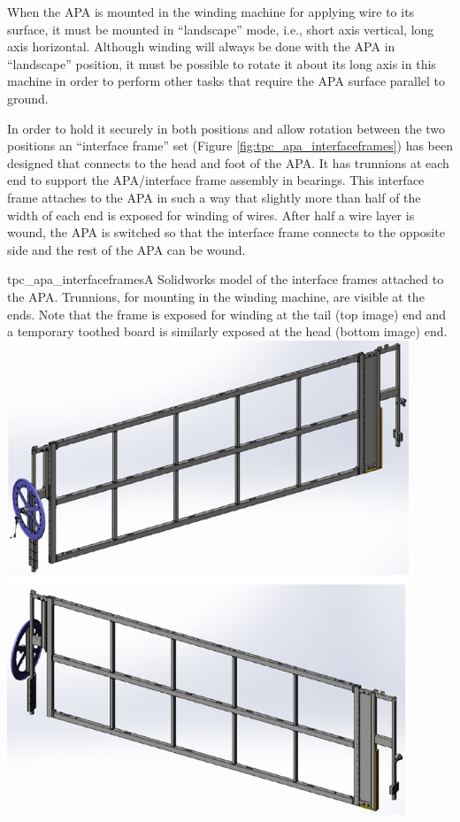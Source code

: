 When the APA is mounted in the winding machine for applying wire to its surface, it must be mounted in ``landscape'' mode, i.e., short axis vertical, long axis horizontal. %
Although winding will always be done with the APA in ``landscape'' position, it must be possible to rotate it about its long axis in this machine in order to perform other tasks that require the APA surface parallel to ground.

In order to hold it securely in both positions and allow rotation between the two positions an ``interface frame'' set (Figure \ref{fig:tpc_apa_interfaceframes}) has been designed that connects to the head and foot of the APA.  It has trunnions at each end  %
to support the APA/interface frame assembly %
in bearings.  This interface frame attaches to the APA in such a way that slightly more than half of the width of each end is exposed for winding of wires.  After half a wire layer is wound, the APA is switched  so that the interface frame connects to the opposite side and the rest of the APA can be wound.

\begin{cdrfigure}{tpc_apa_interfaceframes}{A Solidworks model of the interface frames attached to the APA. Trunnions, for mounting in the winding machine, are visible at the ends. Note that the frame is exposed for winding at the tail (top image) end and a temporary toothed board is similarly exposed at the head (bottom image) end.}
\includegraphics[width=0.9\textwidth]{figures/tpc_apa_interfaceframes.png} 
\end{cdrfigure}

